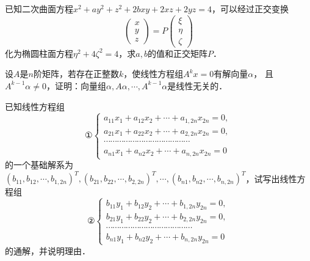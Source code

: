 \documentclass[plain,noanswer,medmath]{../../template/jnuexam}
\begin{document}

\begin{problem}
已知二次曲面方程$x^2 + ay^2 + z^2 + 2bxy + 2xz + 2yz = 4$，可以经过正交变换
$$\begin{pmatrix}
  x \\
  y \\
  z
\end{pmatrix} = P\begin{pmatrix}
  \xi \\
  \eta \\
  \zeta
\end{pmatrix}$$
化为椭圆柱面方程$\eta^2 + 4\zeta^2 = 4$，求$a,b$的值和正交矩阵$P$．
\end{problem}



\begin{problem}
设$A$是$n$阶矩阵，若存在正整数$k$，使线性方程组$A^k x = 0$有解向量$\alpha$，
且$A^{k - 1}\alpha \ne 0$，证明：向量组$\alpha ,A\alpha , \cdots,A^{k - 1}\alpha$是线性无关的．
\end{problem}



\begin{problem}
已知线性方程组
$$\text{①}\begin{cases}
  a_{11}x_1 + a_{12}x_2 + \cdots + a_{1,2n}x_{2n} = 0, \\
  a_{21}x_1 + a_{22}x_2 + \cdots + a_{2,2n}x_{2n} = 0, \\
  \cdots \cdots \cdots \cdots \cdots \cdots \cdots
  \cdots \cdots \cdots \cdots \cdots \cdots \\
  a_{n1}x_1 + a_{n2}x_2 + \cdots + a_{n,2n}x_{2n} = 0
\end{cases}$$
的一个基础解系为$(b_{11},b_{12},\cdots,b_{1,2n})^T, (b_{21},b_{22},\cdots,b_{2,2n})^T,
\cdots,(b_{n1},b_{n2},\cdots,b_{n,2n})^T$，试写出线性方程组
$$\text{②}\begin{cases}
  b_{11}y_1 + b_{12}y_2 + \cdots + b_{1,2n}y_{2n} = 0, \\
  b_{21}y_1 + b_{22}y_2 + \cdots + b_{2,2n}y_{2n} = 0, \\
  \cdots \cdots \cdots \cdots \cdots \cdots \cdots
  \cdots \cdots \cdots \cdots \cdots \cdots \\
  b_{n1}y_1 + b_{n2}y_2 + \cdots + b_{n,2n}y_{2n} = 0
\end{cases}$$
的通解，并说明理由．
\end{problem}


\end{document}
